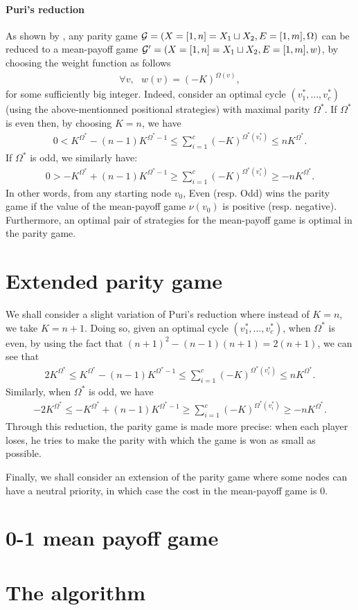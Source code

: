 \documentclass{article}
\def\G{{\cal G}}
\begin{document}
\paragraph{Puri's reduction}

As shown by \citet{puri96}, any parity game $\G=(X=[1,n]=X_1 \sqcup X_2,E=[1,m],\Omega)$ can be reduced to a mean-payoff game $\G'=(X=[1,n]=X_1 \sqcup X_2,E=[1,m],w)$, by choosing the weight function as follows
\begin{align}
  \forall v,~~~ w(v) = (-K)^{\Omega(v)},
\end{align}
for some sufficiently big integer.
Indeed, consider an optimal cycle $(v^*_1,\dots,v^*_c)$ (using the above-mentionned positional strategies) with maximal parity $\Omega^*$. If $\Omega^*$ is even then, by choosing $K=n$, we have
\begin{align}
 0 <  K^{\Omega^*} - (n-1) K^{\Omega^*-1} \le  \sum_{i=1}^{c} (-K)^{\Omega^*(v^*_i)} \le n K^{\Omega^*}.
\end{align}
If $\Omega^*$ is odd, we similarly have:
\begin{align}
0 > -K^{\Omega^*} + (n-1) K^{\Omega^*-1} \ge   \sum_{i=1}^{c} (-K)^{\Omega^*(v^*_i)} \ge -n K^{\Omega^*}.
\end{align}
In other words, from any starting node $v_0$, Even (resp. Odd) wins the parity game if the value of the mean-payoff game $\nu(v_0)$ is positive (resp. negative). Furthermore, an optimal pair of strategies for the mean-payoff game is optimal in the parity game.

\section{Extended parity game}

We shall consider a slight variation of Puri's reduction where instead of $K=n$, we take $K=n+1$. Doing so, given an optimal cycle $(v^*_1,\dots,v^*_c)$, when $\Omega^*$ is even, by using the fact that $(n+1)^2-(n-1)(n+1)=2(n+1)$, we can see that
\begin{align}
   2 K^{\Omega^*} \le  K^{\Omega^*} - (n-1) K^{\Omega^*-1} \le  \sum_{i=1}^{c} (-K)^{\Omega^*(v^*_i)} \le n K^{\Omega^*}.
\end{align}
Similarly, when $\Omega^*$ is odd, we have
\begin{align}
  - 2 K^{\Omega^*} \le  -K^{\Omega^*} + (n-1) K^{\Omega^*-1} \ge \sum_{i=1}^{c} (-K)^{\Omega^*(v^*_i)} \ge -n K^{\Omega^*}.
\end{align}
Through this reduction, the parity game is made more precise: when each player loses, he tries to make the parity with which the game is won as small as possible.

Finally, we shall consider an extension of the parity game where some nodes can have a neutral priority, in which case the cost in the mean-payoff game is $0$.

\section{0-1 mean payoff game}

\section{The algorithm}



 
\end{document}
